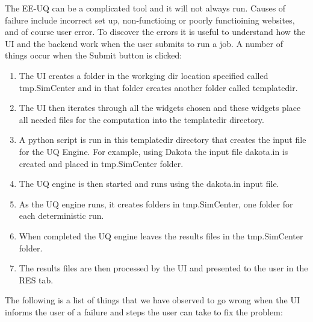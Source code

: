 The EE-UQ can be a complicated tool and it will not always run. Causes of failure include incorrect set up, non-functioing or poorly functioining websites, and of course user error. To discover the errors it is useful to understand how the UI and the backend work when the user submits to run a job. A number of things occur when the Submit button is clicked: 

\begin{enumerate}
\item The UI creates a folder in the workging dir location specified called tmp.SimCenter and in that folder creates another folder called templatedir.
\item The UI then iterates through all the widgets chosen and these widgets place all needed files for the computation into the templatedir directory.
\item A python script is run in this templatedir directory that creates the input file for the UQ Engine. For example, using Dakota the input file dakota.in is created and placed in tmp.SimCenter folder.
\item The UQ engine is then started and runs using the dakota.in input file.
\item As the UQ engine runs, it creates folders in tmp.SimCenter, one folder for each deterministic run.
\item When completed the UQ engine leaves the results files in the tmp.SimCenter folder.
\item The results files are then processed by the UI and presented to the user in the RES tab.
\end{enumerate}

The following is a list of things that we have observed to go wrong when the UI informs the user of a failure and steps the user can take to fix the problem:  

